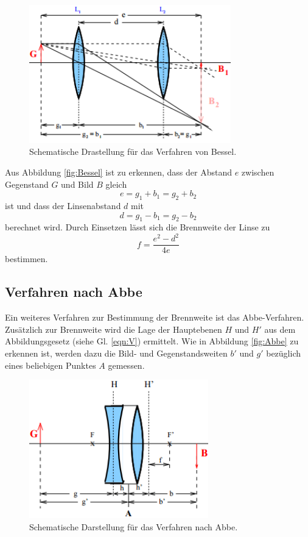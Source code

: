 \begin{figure}[H]
	\centering
	\includegraphics[height=6cm]{picture/Bessel}
	\caption{Schematische Drastellung für das Verfahren von Bessel. \cite[4]{sample}}
	\label{fig:Bessel}
\end{figure}

Aus Abbildung \eqref{fig:Bessel} ist zu erkennen, dass der Abstand $e$ zwischen Gegenstand $G$ und Bild $B$ gleich
\begin{equation*}
	e = g_1 + b_1 = g_2 + b_2
\end{equation*}
ist und dass der Linsenabstand $d$ mit
\begin{equation*}
	d = g_1 - b_1 = g_2 - b_2
\end{equation*}
berechnet wird. Durch Einsetzen lässt sich die Brennweite der Linse zu
\begin{equation}
	f = \frac{e^2 - d^2}{4e}
	\label{eqn:tbes}
\end{equation}
bestimmen.

\subsection{Verfahren nach Abbe}
Ein weiteres Verfahren zur Bestimmung der Brennweite ist das Abbe-Verfahren. Zusätzlich zur Brennweite wird die Lage der Hauptebenen $H$ und $H'$ aus dem Abbildungsgesetz (siehe Gl. \eqref{eqn:V}) ermittelt. Wie in Abbildung \eqref{fig:Abbe} zu erkennen ist, werden dazu die Bild- und Gegenstandsweiten $b'$ und $g'$ bezüglich eines beliebigen Punktes $A$ gemessen.

\begin{figure}[H]
	\centering
	\includegraphics[height=6cm]{picture/Abbe}
	\caption{Schematische Darstellung für das Verfahren nach Abbe. \cite[5]{sample}}
	\label{fig:Abbe}
\end{figure}

